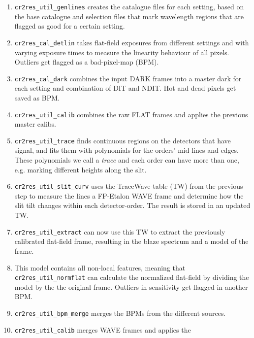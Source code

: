\begin{enumerate}
    \item \texttt{cr2res\_util\_genlines} creates the catalogue files for each
          setting,
          based on the base catalogue and selection files that mark wavelength
          regions
          that are flagged as good for a certain setting.
    \item \texttt{cr2res\_cal\_detlin} takes flat-field exposures from
          different settings and with varying exposure times to measure the
          linearity
          behaviour of all pixels. Outliers get flagged as a bad-pixel-map
          (BPM).
    \item \texttt{cr2res\_cal\_dark} combines the input DARK frames into a
          master dark for
          each setting and combination of DIT and NDIT. Hot and dead pixels get
          saved as BPM.
    \item \texttt{cr2res\_util\_calib} combines the raw FLAT frames and applies
          the	       previous master calibs.
    \item \texttt{cr2res\_util\_trace} finds continuous regions on the
          detectors that
          have signal, and fits them with polynomials for the orders' mid-lines
          and edges.
          These polynomials we call a \emph{trace} and each order can have more
          than one,
          e.g. marking different heights along the slit.
    \item \texttt{cr2res\_util\_slit\_curv} uses the TraceWave-table (TW) from
          the previous
          step to measure the lines a FP-Etalon WAVE frame and determine how
          the
          slit tilt
          changes within each detector-order. The result is stored in an
          updated
          TW.
    \item \texttt{cr2res\_util\_extract} can now use this TW to extract the
          previously
          calibrated flat-field frame, resulting in the blaze spectrum and a
          model of
          the frame.
    \item This model contains all non-local features, meaning that
          \texttt{cr2res\_util\_normflat} can calculate the normalized
          flat-field
          by
          dividing the model by the the original frame. Outliers in sensitivity
          get
          flagged in another BPM.
    \item \texttt{cr2res\_util\_bpm\_merge} merges the BPMs from the different
          sources.
    \item \texttt{cr2res\_util\_calib} merges WAVE frames and applies the

\end{enumerate}
